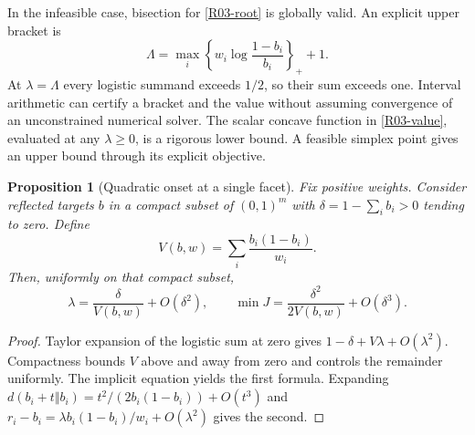 \documentclass[11pt,a4paper]{article}
\newtheorem{proposition}[theorem]{Proposition}
\theoremstyle{definition}\newtheorem{definition}[theorem]{Definition}
\theoremstyle{remark}\newtheorem{remark}[theorem]{Remark}
\numberwithin{equation}{section}
\begin{document}
In the infeasible case, bisection for \eqref{R03-root} is globally valid. An explicit upper bracket is
\[
\Lambda=\max_i\left\{w_i\log\frac{1-b_i}{b_i}\right\}_+ +1.
\]
At $\lambda=\Lambda$ every logistic summand exceeds $1/2$, so their sum exceeds one. Interval arithmetic can certify a bracket and the value without assuming convergence of an unconstrained numerical solver. The scalar concave function in \eqref{R03-value}, evaluated at any $\lambda\geq0$, is a rigorous lower bound. A feasible simplex point gives an upper bound through its explicit objective.

\begin{proposition}[Quadratic onset at a single facet]\label{R03-quad}
Fix positive weights. Consider reflected targets $b$ in a compact subset of $(0,1)^m$ with $\delta=1-\sum_i b_i>0$ tending to zero. Define
\[
V(b,w)=\sum_i\frac{b_i(1-b_i)}{w_i}.
\]
Then, uniformly on that compact subset,
\[
\lambda=\frac{\delta}{V(b,w)}+O(\delta^2),\qquad
\min J=\frac{\delta^2}{2V(b,w)}+O(\delta^3).
\]
\end{proposition}
\begin{proof}
Taylor expansion of the logistic sum at zero gives $1-\delta+V\lambda+O(\lambda^2)$. Compactness bounds $V$ above and away from zero and controls the remainder uniformly. The implicit equation yields the first formula. Expanding $d(b_i+t\Vert b_i)=t^2/(2b_i(1-b_i))+O(t^3)$ and $r_i-b_i=\lambda b_i(1-b_i)/w_i+O(\lambda^2)$ gives the second.
\end{proof}
\end{document}

